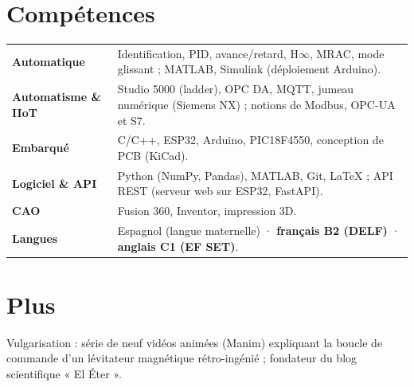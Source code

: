 \documentclass[10pt,a4paper]{article}
\begin{document}
\section{Compétences}
{\small
\begin{tabularx}{\linewidth}{@{}l X@{}}
\textbf{Automatique} & Identification, PID, avance/retard, H$\infty$, MRAC, mode glissant ; MATLAB, Simulink (déploiement Arduino). \\
\textbf{Automatisme \& IIoT} & Studio 5000 (ladder), OPC DA, MQTT, jumeau numérique (Siemens NX) ; notions de Modbus, OPC-UA et S7. \\
\textbf{Embarqué} & C/C++, ESP32, Arduino, PIC18F4550, conception de PCB (KiCad). \\
\textbf{Logiciel \& API} & Python (NumPy, Pandas), MATLAB, Git, LaTeX ; API REST (serveur web sur ESP32, FastAPI). \\
\textbf{CAO} & Fusion 360, Inventor, impression 3D. \\
\textbf{Langues} & Espagnol (langue maternelle) \;·\; \textbf{français B2 (DELF)} \;·\; \textbf{anglais C1 (EF SET)}. \\
\end{tabularx}}

\section{Plus}
{\small Vulgarisation : série de neuf vidéos animées (Manim) expliquant la boucle de commande d'un lévitateur magnétique
rétro-ingénié ; fondateur du blog scientifique « El Éter ».}
\end{document}
